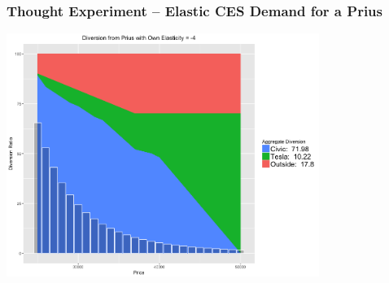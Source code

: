 \documentclass[xcolor=pdftex,dvipsnames,table,mathserif]{beamer}
\begin{document}
\begin{frame}
\frametitle{Thought Experiment -- Elastic CES Demand for a Prius}
\begin{center}
\includegraphics[width=4in]{./resources/new_prius4.png}
\end{center}
\end{frame}
\end{document}
